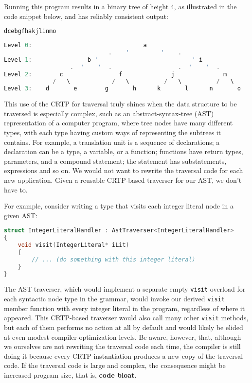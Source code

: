 \noindent Running this program results in a binary tree of height 4, as
illustrated in the code snippet below, and has reliably consistent output:

\begin{lstlisting}[language=C++]
dcebgfhakjlinmo
\end{lstlisting}
    
\begin{lstlisting}[language=C++]
Level 0:                                a
                              .    '         '    .
Level 1:                b '                           ' i
                   .  '    '  .                   .  '    '  .
Level 2:        c                f              j              m
              /   \            /   \          /   \          /   \
Level 3:    d       e        g       h      k       l      n       o
\end{lstlisting}
    
\noindent This use of the CRTP for traversal truly shines when the data structure to
be traversed is especially complex, such as an abstract-syntax-tree
(AST) representation of a computer program, where tree nodes have many
different types, with each type having custom ways of representing the
subtrees it contains. For example, a translation unit is a sequence of
declarations; a declaration can be a type, a variable, or a function;
functions have return types, parameters, and a compound statement; the
statement has substatements, expressions and so on. We would not want
to rewrite the traversal code for each new application. Given a reusable
CRTP-based traverser for our AST, we don't have to.

For example, consider writing a type that visits each integer literal
node in a given AST:

\begin{lstlisting}[language=C++]
struct IntegerLiteralHandler : AstTraverser<IntegerLiteralHandler>
{
    void visit(IntegerLiteral* iLit)
    {
        // ... (do something with this integer literal)
    }
}
\end{lstlisting}
    
\noindent The AST traverser, which would implement a separate empty \texttt{visit}
overload for each syntactic node type in the grammar, would invoke our
derived \texttt{visit} member function with every integer literal in the
program, regardless of where it appeared. This CRTP-based traverser
would also call many other \texttt{visit} methods, but each of them performs no action at all by default and would likely be elided at even modest compiler-optimization levels. Be aware, however, that, although we ourselves are
not rewriting the traversal code each time, the compiler is still doing
it because every CRTP instantiation produces a new copy of the traversal
code. If the traversal code is large and complex, the consequence might
be increased program size, that is, \textbf{code bloat}.

